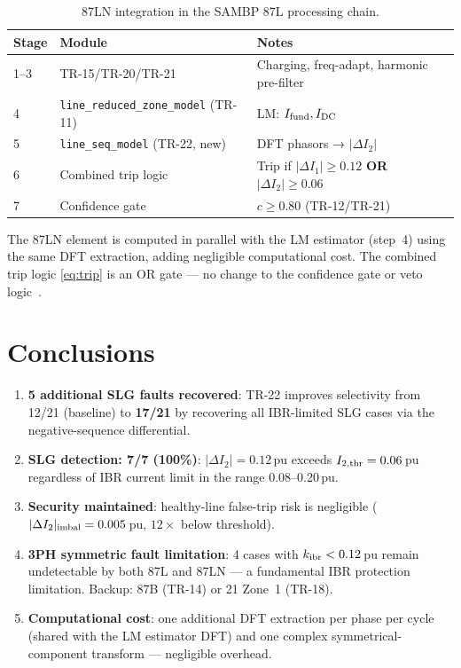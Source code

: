 \documentclass[11pt, a4paper]{article}
\begin{document}
\begin{table}[h]
  \centering
  \caption{87LN integration in the SAMBP 87L processing chain.}
  \label{tab:integration}
  \begin{tabular}{lll}
    \toprule
    Stage & Module & Notes \\
    \midrule
    1–3 & TR-15/TR-20/TR-21 & Charging, freq-adapt, harmonic pre-filter \\
    4   & \texttt{line\_reduced\_zone\_model} (TR-11) & LM: $I_{\rm fund}, I_{\rm DC}$ \\
    5   & \texttt{line\_seq\_model} (TR-22, new) &
          DFT phasors → $|\Delta I_2|$ \\
    6   & Combined trip logic & Trip if $|\Delta I_1| \geq 0.12$ \textbf{OR}
          $|\Delta I_2| \geq 0.06$ \\
    7   & Confidence gate & $c \geq 0.80$ (TR-12/TR-21) \\
    \bottomrule
  \end{tabular}
\end{table}

The 87LN element is computed in parallel with the LM estimator (step~4)
using the same DFT extraction, adding negligible computational cost.  The
combined trip logic \eqref{eq:trip} is an OR gate — no change to the
confidence gate or veto logic~\cite{IEEE_C37_243,SAMBP_TR21}.


\section{Conclusions}
\label{sec:conclusions}

\begin{enumerate}
  \item \textbf{5 additional SLG faults recovered}: TR-22 improves
        selectivity from 12/21 (baseline) to \textbf{17/21} by recovering all
        IBR-limited SLG cases via the negative-sequence differential.
  \item \textbf{SLG detection: 7/7 (100\%)}: $|\Delta I_2| = 0.12$\,pu
        exceeds $I_{2,\rm thr} = 0.06$\,pu regardless of IBR current
        limit in the range 0.08--0.20\,pu.
  \item \textbf{Security maintained}: healthy-line false-trip risk is
        negligible ($|\Delta I_2|_{\rm imbal} = 0.005$\,pu, $12\times$
        below threshold).
  \item \textbf{3PH symmetric fault limitation}: 4 cases with
        $k_{\rm ibr} < 0.12$\,pu remain undetectable by both 87L and 87LN
        — a fundamental IBR protection limitation.  Backup: 87B (TR-14)
        or 21 Zone~1 (TR-18).
  \item \textbf{Computational cost}: one additional DFT extraction per
        phase per cycle (shared with the LM estimator DFT) and one
        complex symmetrical-component transform — negligible overhead.
\end{enumerate}
\end{document}

